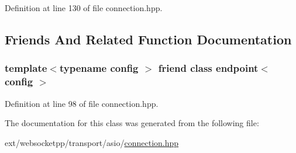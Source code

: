Definition at line 130 of file connection.\+hpp.



\subsection{Friends And Related Function Documentation}
\hypertarget{classwebsocketpp_1_1transport_1_1asio_1_1connection_ad7f0fad4f6837f8f4e97cf905b3a231f}{}
\subsubsection[{endpoint$<$ config $>$}]{\setlength{\rightskip}{0pt plus 5cm}template$<$typename config $>$ friend class {\bf endpoint}$<$ config $>$\hspace{0.3cm}{\ttfamily [friend]}}\label{classwebsocketpp_1_1transport_1_1asio_1_1connection_ad7f0fad4f6837f8f4e97cf905b3a231f}


Definition at line 98 of file connection.\+hpp.



The documentation for this class was generated from the following file\+:\begin{DoxyCompactItemize}
\item 
ext/websocketpp/transport/asio/\hyperlink{transport_2asio_2connection_8hpp}{connection.\+hpp}\end{DoxyCompactItemize}
